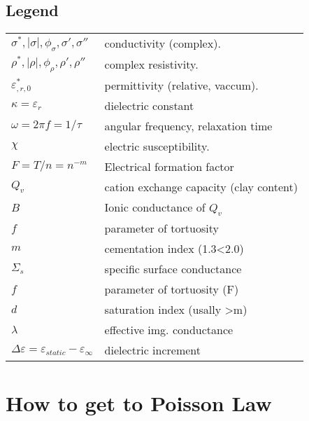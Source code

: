 \documentclass[twocolumn]{article}
\begin{document}
\subsection{Legend}
\begin{tabular}{@{}ll@{}}
$\sigma^*,|\sigma|,\phi_\sigma,\sigma',\sigma''$	& conductivity (complex). \\
$\rho^*,|\rho|,\phi_\rho,\rho',\rho''$  			& complex resistivity. \\
$\varepsilon_{,r,0}^*$ 								& permittivity (relative, vaccum). \\
$\kappa =\varepsilon_r$ 							& dielectric constant\\
$\omega=2\pi f =1/\tau$  						& angular frequency, relaxation time \\
$\chi$ 											& electric susceptibility.\\
$F=T/n = n^{-m}$ 								& Electrical formation factor\\
$Q_v$ 											& cation exchange capacity (clay content)\\
$B$ 												& Ionic conductance of $Q_v$\\
$f$ 												& parameter of tortuosity\\
$m$ 												& cementation index (1.3<2.0)\\
$\Sigma_s$ 										& specific surface conductance\\
$f$ 												& parameter of tortuosity (F)\\
$d$ 												& saturation index (usally >m)\\
$\lambda$ 										& effective img. conductance\\
$\Delta \varepsilon = \varepsilon_{static} -\varepsilon_\infty$ & dielectric increment
\end{tabular}








\section{How to get to Poisson Law}
\end{document}
